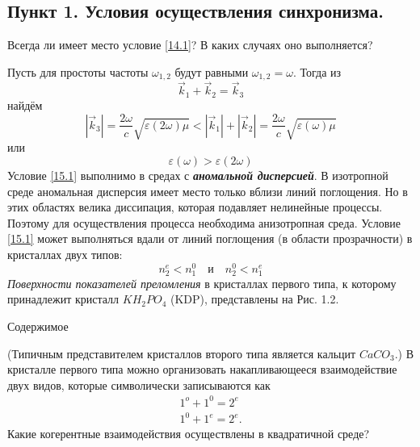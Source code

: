 \documentclass[a4paper]{article}
\begin{document}
 	 \subsection*{Пункт 1. Условия осуществления синхронизма.} 
 	Всегда ли имеет место условие \eqref{14.1}? В каких случаях оно выполняется? 
 		
		\begin{minipage}{0.5\textwidth}
			\begin{flushleft}
				Пусть для простоты частоты $\omega_{1,2}$ будут равными $\omega_{1,2}=\omega$. Тогда из $$\vec{k}_{1}+\vec{k}_{2}=\vec{k}_{3}$$ найдём $$\left|\vec{k}_{3}\right|=\frac{2\omega}{c}\sqrt{\varepsilon(2\omega)\mu}<|\vec{k}_{1}|+|\vec{k}_{2}|=\frac{2\omega}{c}\sqrt{\varepsilon(\omega)\mu}$$
				или 
				\begin{equation}
					\varepsilon(\omega)>\varepsilon(2\omega)
					\label{15.1}
				\end{equation}
			Условие \eqref{15.1} выполнимо в средах с \textit{\textbf{аномальной дисперсией}}. В изотропной среде аномальная дисперсия имеет место только вблизи линий поглощения. Но в этих областях велика диссипация, которая подавляет нелинейные процессы. Поэтому для осуществления процесса необходима анизотропная среда. Условие \eqref{15.1} может выполняться  вдали от линий поглощения (в области прозрачности) в кристаллах двух типов:  
			\begin{equation}
				n_{2}^{e}<n_{1}^{0}\quad\text{и}\quad n_{2}^{0}<n_{1}^{e}
				\label{16.1}
			\end{equation}
			\textit{Поверхности показателей преломления} в кристаллах первого типа, к которому принадлежит кристалл $KH_{2}PO_{4}$ (KDP), представлены на Рис. 1.2. 
			\end{flushleft}
		\end{minipage}
		\begin{minipage}{0.5\textwidth}
			\begin{flushright}
				Содержимое
			\end{flushright}
		\end{minipage}
		\newpage
		(Типичным представителем кристаллов второго типа является кальцит  $CaCO_{3}$.) В кристалле первого типа можно организовать накапливающееся взаимодействие двух видов, которые символически записываются как
		\begin{align}
			1^{o}+1^{0}=2^{e}\tag{17a}\\
			1^{0}+1^{e}=2^{e}.\tag{17б}			
		\end{align}	
		Какие  когерентные взаимодействия осуществлены в квадратичной среде?  
\end{document}
